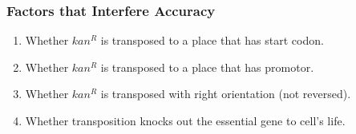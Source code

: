 \documentclass{article}
\begin{document}
			\subsubsection{Factors that Interfere Accuracy}
				\begin{enumerate}
					\item Whether $kan^R$ is transposed to a place that has start codon.
					\item Whether $kan^R$ is transposed to a place that has promotor.
					\item Whether $kan^R$ is transposed with right orientation (not reversed).
					\item Whether transposition knocks out the essential gene to cell's life.
				\end{enumerate}
\end{document}
